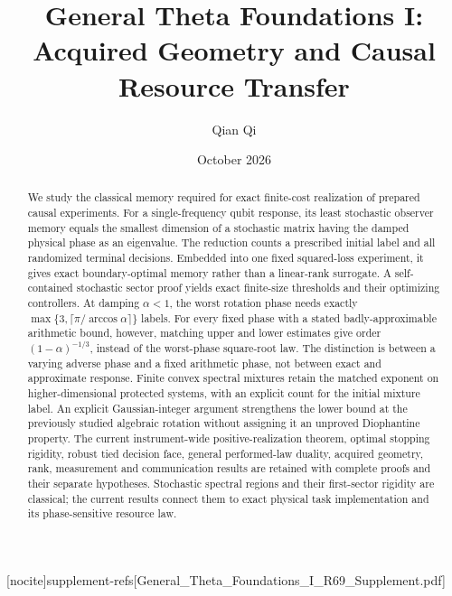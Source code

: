 
[nocite]{supplement-refs}[General_Theta_Foundations_I_R69_Supplement.pdf]
\title[Acquired geometry and causal resource transfer]{General Theta Foundations I:\\Acquired Geometry and Causal Resource Transfer}
\author{Qian Qi}\date{October 2026}

\begin{abstract}
We study the classical memory required for exact finite-cost realization of prepared causal experiments. For a single-frequency qubit response, its least stochastic observer memory equals the smallest dimension of a stochastic matrix having the damped physical phase as an eigenvalue. The reduction counts a prescribed initial label and all randomized terminal decisions. Embedded into one fixed squared-loss experiment, it gives exact boundary-optimal memory rather than a linear-rank surrogate. A self-contained stochastic sector proof yields exact finite-size thresholds and their optimizing controllers. At damping $\alpha<1$, the worst rotation phase needs exactly $\max\{3,\lceil\pi/\arccos\alpha\rceil\}$ labels. For every fixed phase with a stated badly-approximable arithmetic bound, however, matching upper and lower estimates give order $(1-\alpha)^{-1/3}$, instead of the worst-phase square-root law. The distinction is between a varying adverse phase and a fixed arithmetic phase, not between exact and approximate response. Finite convex spectral mixtures retain the matched exponent on higher-dimensional protected systems, with an explicit count for the initial mixture label. An explicit Gaussian-integer argument strengthens the lower bound at the previously studied algebraic rotation without assigning it an unproved Diophantine property. The current instrument-wide positive-realization theorem, optimal stopping rigidity, robust tied decision face, general performed-law duality, acquired geometry, rank, measurement and communication results are retained with complete proofs and their separate hypotheses. Stochastic spectral regions and their first-sector rigidity are classical; the current results connect them to exact physical task implementation and its phase-sensitive resource law.
\end{abstract}
\maketitle








